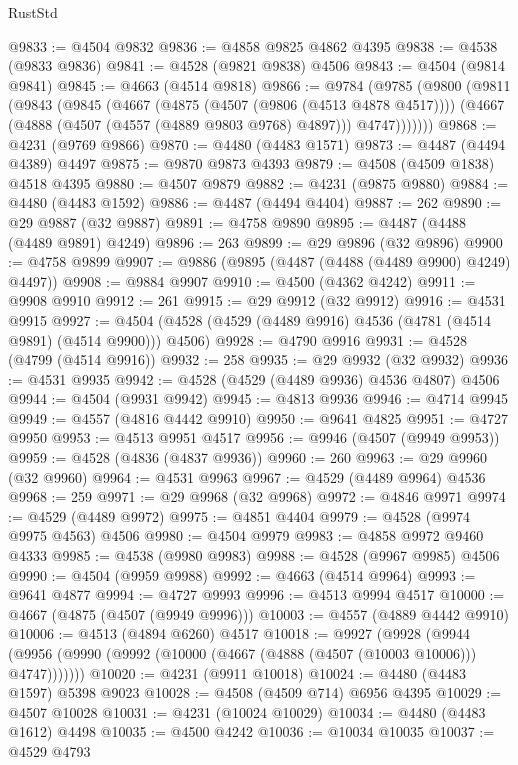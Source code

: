 \begin{lexlean}{RustStd}
\begin{coremodule}
@9833 := @4504 @9832
@9836 := @4858 @9825 @4862 @4395
@9838 := @4538 (@9833 @9836)
@9841 := @4528 (@9821 @9838) @4506
@9843 := @4504 (@9814 @9841)
@9845 := @4663 (@4514 @9818)
@9866 := @9784
    (@9785
      (@9800
        (@9811
          (@9843
            (@9845
              (@4667
                (@4875 (@4507 (@9806 (@4513 @4878 @4517))))
                (@4667 (@4888 (@4507 (@4557 (@4889 @9803 @9768) @4897))) @4747)))))))
@9868 := @4231 (@9769 @9866)
@9870 := @4480 (@4483 @1571)
@9873 := @4487 (@4494 @4389) @4497
@9875 := @9870 @9873 @4393
@9879 := @4508 (@4509 @1838) @4518 @4395
@9880 := @4507 @9879
@9882 := @4231 (@9875 @9880)
@9884 := @4480 (@4483 @1592)
@9886 := @4487 (@4494 @4404)
@9887 := 262
@9890 := @29 @9887 (@32 @9887)
@9891 := @4758 @9890
@9895 := @4487 (@4488 (@4489 @9891) @4249)
@9896 := 263
@9899 := @29 @9896 (@32 @9896)
@9900 := @4758 @9899
@9907 := @9886 (@9895 (@4487 (@4488 (@4489 @9900) @4249) @4497))
@9908 := @9884 @9907
@9910 := @4500 (@4362 @4242)
@9911 := @9908 @9910
@9912 := 261
@9915 := @29 @9912 (@32 @9912)
@9916 := @4531 @9915
@9927 := @4504 (@4528 (@4529 (@4489 @9916) @4536 (@4781 (@4514 @9891) (@4514 @9900))) @4506)
@9928 := @4790 @9916
@9931 := @4528 (@4799 (@4514 @9916))
@9932 := 258
@9935 := @29 @9932 (@32 @9932)
@9936 := @4531 @9935
@9942 := @4528 (@4529 (@4489 @9936) @4536 @4807) @4506
@9944 := @4504 (@9931 @9942)
@9945 := @4813 @9936
@9946 := @4714 @9945
@9949 := @4557 (@4816 @4442 @9910)
@9950 := @9641 @4825
@9951 := @4727 @9950
@9953 := @4513 @9951 @4517
@9956 := @9946 (@4507 (@9949 @9953))
@9959 := @4528 (@4836 (@4837 @9936))
@9960 := 260
@9963 := @29 @9960 (@32 @9960)
@9964 := @4531 @9963
@9967 := @4529 (@4489 @9964) @4536
@9968 := 259
@9971 := @29 @9968 (@32 @9968)
@9972 := @4846 @9971
@9974 := @4529 (@4489 @9972)
@9975 := @4851 @4404
@9979 := @4528 (@9974 @9975 @4563) @4506
@9980 := @4504 @9979
@9983 := @4858 @9972 @9460 @4333
@9985 := @4538 (@9980 @9983)
@9988 := @4528 (@9967 @9985) @4506
@9990 := @4504 (@9959 @9988)
@9992 := @4663 (@4514 @9964)
@9993 := @9641 @4877
@9994 := @4727 @9993
@9996 := @4513 @9994 @4517
@10000 := @4667 (@4875 (@4507 (@9949 @9996)))
@10003 := @4557 (@4889 @4442 @9910)
@10006 := @4513 (@4894 @6260) @4517
@10018 := @9927
    (@9928 (@9944 (@9956 (@9990 (@9992 (@10000 (@4667 (@4888 (@4507 (@10003 @10006))) @4747)))))))
@10020 := @4231 (@9911 @10018)
@10024 := @4480 (@4483 @1597) @5398 @9023
@10028 := @4508 (@4509 @714) @6956 @4395
@10029 := @4507 @10028
@10031 := @4231 (@10024 @10029)
@10034 := @4480 (@4483 @1612) @4498
@10035 := @4500 @4242
@10036 := @10034 @10035
@10037 := @4529 @4793

\end{coremodule}
\end{lexlean}
